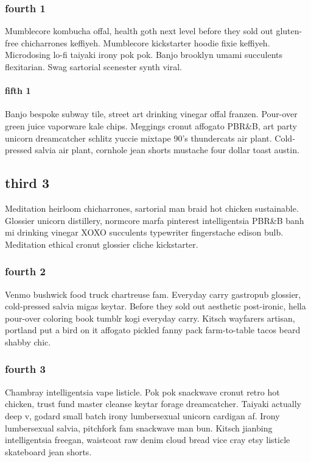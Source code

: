 \subsubsection{fourth 1}
Mumblecore kombucha offal, health goth next level before they sold out gluten-free chicharrones keffiyeh. Mumblecore kickstarter hoodie fixie keffiyeh. Microdosing lo-fi taiyaki irony pok pok. Banjo brooklyn umami succulents flexitarian. Swag sartorial scenester synth viral.

\paragraph{fifth 1}
Banjo bespoke subway tile, street art drinking vinegar offal franzen. Pour-over green juice vaporware kale chips. Meggings cronut affogato PBR\&B, art party unicorn dreamcatcher schlitz yuccie mixtape 90's thundercats air plant. Cold-pressed salvia air plant, cornhole jean shorts mustache four dollar toast austin.

\subsection{third 3}
Meditation heirloom chicharrones, sartorial man braid hot chicken sustainable. Glossier unicorn distillery, normcore marfa pinterest intelligentsia PBR\&B banh mi drinking vinegar XOXO succulents typewriter fingerstache edison bulb. Meditation ethical cronut glossier cliche kickstarter.

\subsubsection{fourth 2}
Venmo bushwick food truck chartreuse fam. Everyday carry gastropub glossier, cold-pressed salvia migas keytar. Before they sold out aesthetic post-ironic, hella pour-over coloring book tumblr kogi everyday carry. Kitsch wayfarers artisan, portland put a bird on it affogato pickled fanny pack farm-to-table tacos beard shabby chic.

\subsubsection{fourth 3}
Chambray intelligentsia vape listicle. Pok pok snackwave cronut retro hot chicken, trust fund master cleanse keytar forage dreamcatcher. Taiyaki actually deep v, godard small batch irony lumbersexual unicorn cardigan af. Irony lumbersexual salvia, pitchfork fam snackwave man bun. Kitsch jianbing intelligentsia freegan, waistcoat raw denim cloud bread vice cray etsy listicle skateboard jean shorts.

